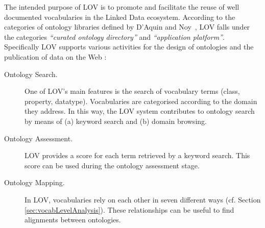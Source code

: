 \documentclass{iosart2c}
\begin{document}
The intended purpose of LOV is to promote and facilitate the reuse of well documented vocabularies in the Linked Data ecosystem. According to the categories of ontology libraries defined by D'Aquin and Noy~\cite{AquinJoWS12}, LOV falls under the categories \textit{``curated ontology directory''}  and \textit{``application platform''}.  Specifically LOV supports various activities for the design of ontologies and the publication of data on the Web \cite{MC10, ohdeploying, pedrinaci2014, villata2012}:

\begin{description}
 \item [Ontology Search.] One of LOV's main features is the search of vocabulary terms (class, property, datatype). Vocabularies are categorised according to the domain they address. In this way, the LOV system contributes to ontology search by means of (a) keyword search and (b) domain browsing.
 \item [Ontology Assessment.] LOV provides a score for each term retrieved by a keyword search. This score can be used during the ontology assessment stage.
 \item [Ontology Mapping.] In LOV, vocabularies rely on each other in seven different ways (cf. Section \ref{sec:vocabLevelAnalysis}). These relationships can be useful to find alignments between ontologies. 
\end{description}





\end{document}

